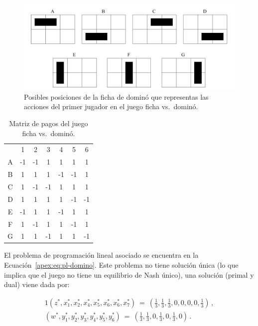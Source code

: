 \begin{figure}[t]
\centering
\includegraphics[width=\textwidth]{figuras/posiciones-domino.png}
\caption{Posibles posiciones de la ficha de dominó que representas las acciones del primer jugador en el juego ficha vs.\ dominó.}
\label{fig:posiciones-domino}
\end{figure}

\begin{table}[t]
\begin{center}
\caption{Matriz de pagos del juego ficha vs.\ dominó.}
\label{table:pagos-domino}
\begin{tabular}{ c | c | c | c | c | c | c |}
\multicolumn{1}{c}{}  &  \multicolumn{1}{c}{1} &  \multicolumn{1}{c}{2} & \multicolumn{1}{c}{3} & \multicolumn{1}{c}{4} & \multicolumn{1}{c}{5} & \multicolumn{1}{c}{6} \\ \cline{2-7}
A & -1 & -1 &  1 &  1 &  1 &  1 \\ \cline{2-7}
B &  1 &  1 &  1 & -1 & -1 &  1 \\ \cline{2-7}
C &  1 & -1 & -1 &  1 &  1 &  1 \\ \cline{2-7}
D &  1 &  1 &  1 &  1 & -1 & -1 \\ \cline{2-7}
E & -1 &  1 &  1 & -1 &  1 &  1 \\ \cline{2-7}
F &  1 & -1 &  1 &  1 & -1 &  1 \\ \cline{2-7}
G &  1 &  1 & -1 &  1 &  1 & -1 \\ \cline{2-7}
\end{tabular}
\end{center}
\end{table}

El problema de programación lineal asociado se encuentra en la Ecuación~\ref{apex:eq:pl-domino}. Este problema no tiene solución única (lo que implica que el juego no tiene un equilibrio de Nash único), una solución (primal y dual) viene dada por:

\begin{alignat}{1}
(z^*, x^*_1, x^*_2, x^*_4, x^*_5, x^*_6, x^*_6, x^*_7)\ =\ \left(\frac{1}{3}, \frac{1}{3}, \frac{1}{3}, 0, 0, 0, 0, \frac{1}{3}\right) \,, \\
(w^*, y^*_1, y^*_2, y^*_3,  y^*_4, y^*_5, y^*_6)\ =\ \left(\frac{1}{3}, \frac{1}{3}, 0, \frac{1}{3}, 0, \frac{1}{3}, 0\right) \,.
\end{alignat}


